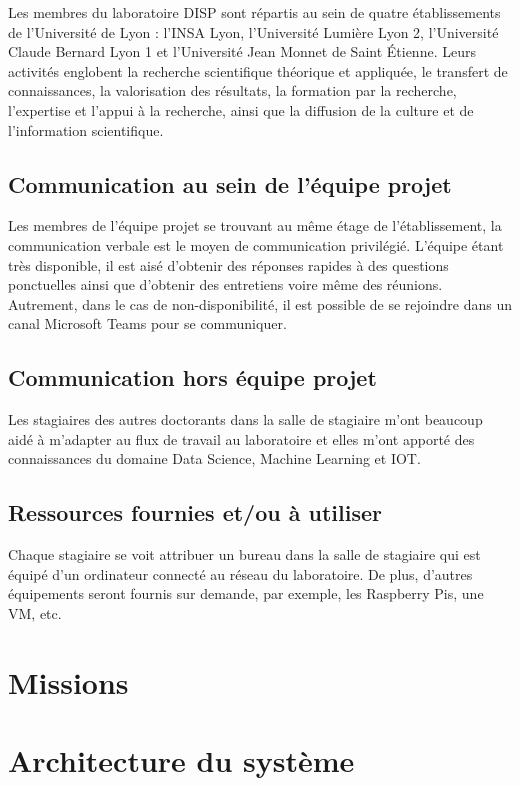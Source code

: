 \documentclass{template}
\begin{document}
Les membres du laboratoire DISP \cite{DISPdesc} sont répartis au sein de quatre établissements de l'Université de Lyon : l'INSA Lyon, l'Université Lumière Lyon 2, l'Université Claude Bernard Lyon 1 et l'Université Jean Monnet de Saint Étienne. Leurs activités englobent la recherche scientifique théorique et appliquée, le transfert de connaissances, la valorisation des résultats, la formation par la recherche, l'expertise et l'appui à la recherche, ainsi que la diffusion de la culture et de l'information scientifique. 
\subsection{Communication au sein de l’équipe projet}
Les membres de l’équipe projet se trouvant au même étage de l’établissement, la communication verbale est le moyen de communication privilégié. L’équipe étant très disponible, il est aisé d’obtenir des réponses rapides à des questions ponctuelles ainsi que d’obtenir des entretiens voire même des réunions. Autrement, dans le cas de non-disponibilité, il est possible de se rejoindre dans un canal Microsoft Teams pour se communiquer.
\subsection{Communication hors équipe projet}
Les stagiaires des autres doctorants dans la salle de stagiaire m'ont beaucoup aidé à m'adapter au flux de travail au laboratoire et elles m'ont apporté des connaissances du domaine Data Science, Machine Learning et IOT.
\subsection{Ressources fournies et/ou à utiliser}
Chaque stagiaire se voit attribuer un bureau dans la salle de stagiaire qui est équipé d'un ordinateur connecté au réseau du laboratoire. De plus, d'autres équipements seront fournis sur demande, par exemple, les Raspberry Pis, une VM, etc.
\newpage
\section*{Missions}

\section{Architecture du système}
\end{document}
